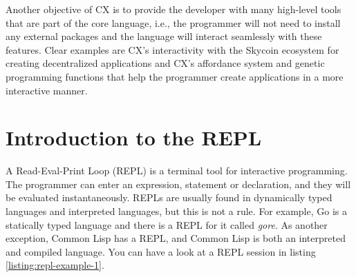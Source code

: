 \documentclass[11pt,fleqn,openany]{book} %
\begin{document}
Another objective of CX is to provide the developer with many high-level tools that are part of the core language, i.e., the programmer will not need to install any external packages and the language will interact seamlessly with these features. Clear examples are CX's interactivity with the Skycoin ecosystem for creating decentralized applications and CX's affordance system and genetic programming functions that help the programmer create applications in a more interactive manner.

\section{Introduction to the REPL}
\label{section:introduction-to-the-repl}


A Read-Eval-Print Loop (REPL) is a terminal tool for interactive programming. The programmer can enter an expression, statement or declaration, and they will be evaluated instantaneously. REPLs are usually found in dynamically typed languages and interpreted languages, but this is not a rule. For example, Go is a statically typed language and there is a REPL for it called \emph{gore}. As another exception, Common Lisp has a REPL, and Common Lisp is both an interpreted and compiled language. You can have a look at a REPL session in listing \ref{listing:repl-example-1}.
\end{document}
